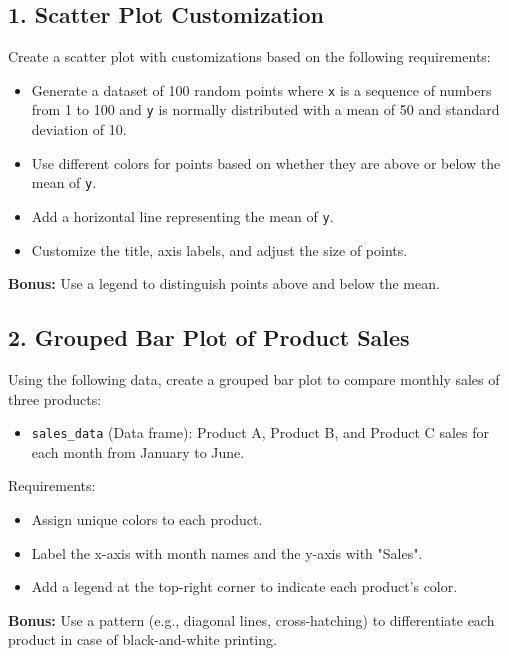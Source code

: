 \documentclass[10pt]{book}
\begin{document}
\subsection*{1. Scatter Plot Customization}
Create a scatter plot with customizations based on the following requirements:
\begin{itemize}
    \item Generate a dataset of 100 random points where \texttt{x} is a sequence of numbers from 1 to 100 and \texttt{y} is normally distributed with a mean of 50 and standard deviation of 10.
    \item Use different colors for points based on whether they are above or below the mean of \texttt{y}.
    \item Add a horizontal line representing the mean of \texttt{y}.
    \item Customize the title, axis labels, and adjust the size of points.
\end{itemize}

\textbf{Bonus:} Use a legend to distinguish points above and below the mean.

\subsection*{2. Grouped Bar Plot of Product Sales}
Using the following data, create a grouped bar plot to compare monthly sales of three products:
\begin{itemize}
    \item \texttt{sales\_data} (Data frame): Product A, Product B, and Product C sales for each month from January to June.
\end{itemize}
Requirements:
\begin{itemize}
    \item Assign unique colors to each product.
    \item Label the x-axis with month names and the y-axis with "Sales".
    \item Add a legend at the top-right corner to indicate each product's color.
\end{itemize}

\textbf{Bonus:} Use a pattern (e.g., diagonal lines, cross-hatching) to differentiate each product in case of black-and-white printing.
\end{document}
